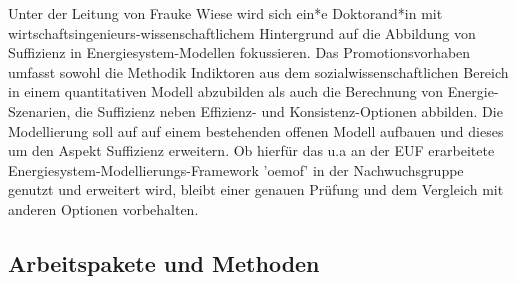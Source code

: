 \documentclass[a4paper,11pt,twoside]{scrartcl}
\begin{document}
Unter der Leitung von Frauke Wiese wird sich ein*e Doktorand*in mit wirtschaftsingenieurs-wissenschaftlichem Hintergrund auf die Abbildung von Suffizienz in Energiesystem-Modellen fokussieren. Das Promotionsvorhaben umfasst sowohl die Methodik Indiktoren aus dem sozialwissenschaftlichen Bereich in einem quantitativen Modell abzubilden als auch die Berechnung von Energie-Szenarien, die Suffizienz neben Effizienz- und Konsistenz-Optionen abbilden. Die Modellierung soll auf auf einem bestehenden offenen Modell aufbauen und dieses um den Aspekt Suffizienz erweitern. Ob hierfür das u.a an der EUF erarbeitete Energiesystem-Modellierungs-Framework 'oemof' in der Nachwuchsgruppe genutzt und erweitert wird, bleibt einer genauen Prüfung und dem Vergleich mit anderen Optionen vorbehalten.

\subsection{Arbeitspakete und Methoden}
\end{document}
